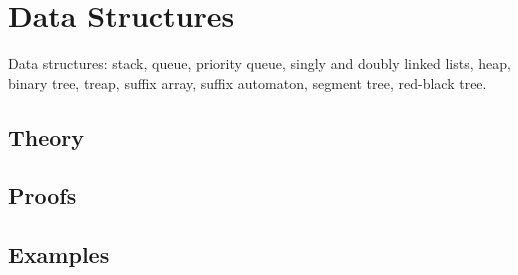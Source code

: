 
\section{Data Structures}
\label{sec:1.3.08-data-structures}

\begin{ticket}
Data structures: stack, queue, priority queue, singly and doubly linked lists, heap, binary tree, treap, suffix array, suffix automaton, segment tree, red-black tree.
\end{ticket}

\subsection*{Theory}

\subsection*{Proofs}

\subsection*{Examples}
